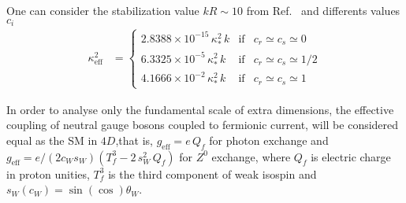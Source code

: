 One can consider the stabilization value $kR\sim10$ from Ref.~\cite{Goldberger:1999uk} and differents values $c_i$
\begin{align}
\kappa_{\text{eff}}^2 &= \left\{ \begin{matrix}
                           2.8388\times10^{-15}\,\kappa_*^2\,k & \text{if} & c_r\simeq c_s\simeq 0 \\
                           6.3325\times10^{-5}\,\kappa_*^2\,k & \text{if} & c_r\simeq c_s\simeq 1/2 \\
                           4.1666\times10^{-2}\,\kappa_*^2\,k & \text{if} & c_r\simeq c_s\simeq 1 
                          \end{matrix} \right.
\end{align}

In order to analyse only the fundamental scale of extra dimensions, the effective coupling of neutral gauge bosons coupled to fermionic current, will be considered equal as the SM in $4D$,that is, $g_{\text{eff}} = e\,Q_f$ for photon exchange and $g_{\text{eff}} = e/(2c_Ws_W)\left(T^3_f - 2\,s_W^2\,Q_f\right)$ for $Z^0$ exchange, where $Q_f$ is electric charge in proton unities, $T_f^3$ is the third component of weak isospin and $s_W(c_W) = \sin(\cos)\theta_W$. 




